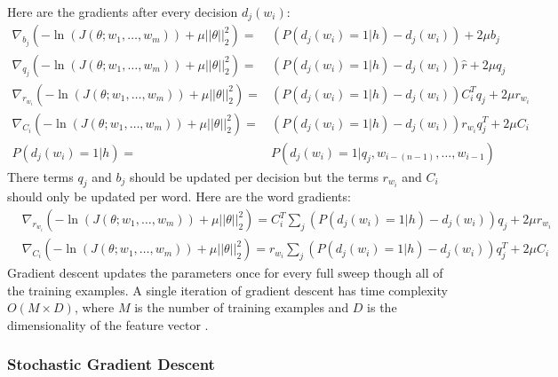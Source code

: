 Here are the gradients after every decision $d_j(w_i)$:
\begin{align}
\nabla_{b_j} \left( -\ln(J(\theta;w_1,\dots, w_m)) +  \mu ||\theta||^2_2 \right)  = &  \left( P \left(d_j(w_i) = 1 | h \right) - d_j(w_i) \right) +2\mu b_j  \label{eq:gradients}
\\
\nabla_{q_j} \left( -\ln(J(\theta;w_1,\dots, w_m)) +  \mu ||\theta||^2_2 \right)  = &\left( P \left(d_j(w_i) = 1 | h \right) - d_j(w_i) \right)\hat{r} +2\mu q_j \nonumber
\\
\nabla_{r_{w_i}} \left( -\ln(J(\theta;w_1,\dots, w_m)) +  \mu ||\theta||^2_2 \right)  = & \left( P \left(d_j(w_i) = 1 | h \right) - d_j(w_i)\right) C_i^T q_j   +2\mu r_{w_i} \nonumber
\\
\nabla_{C_i} \left( -\ln(J(\theta;w_1,\dots, w_m)) +  \mu ||\theta||^2_2 \right)  = &\left( P \left(d_j(w_i) = 1 | h \right) - d_j(w_i) \right) r_{w_i}q_j^T  +2\mu C_i \nonumber
\\
P \left(d_j(w_i) = 1 | h \right)= & P \left(d_j(w_i) = 1 | q_j, w_{i-(n-1)},\dots, w_{i-1} \right) \nonumber
\end{align}
There terms $q_j$ and $b_j$ should be updated per decision but the terms $r_{w_i}$ and $C_i$ should only be updated per word. Here are the word gradients:
\begin{align}
& \nabla_{r_{w_i}} \left( -\ln(J(\theta;w_1,\dots, w_m)) +  \mu ||\theta||^2_2 \right)  =  C_i^T \sum_j \left( P \left(d_j(w_i) = 1 | h \right)  - d_j(w_i) \right)q_j +2\mu r_{w_i} \nonumber
\\
& \nabla_{C_i} \left( -\ln(J(\theta;w_1,\dots, w_m)) +  \mu ||\theta||^2_2 \right)  =  r_{w_i} \sum_j \left( P \left(d_j(w_i) = 1 | h \right) - d_j(w_i) \right) q_j^T  +2\mu C_i
\end{align}
Gradient descent updates the parameters once for every full sweep though all of the training examples. A single iteration of gradient descent has time complexity $O(M\times D)$, where $M$ is the number of training examples and $D$ is the dimensionality of the feature vector \cite{Elkan2013}. 

\subsubsection{Stochastic Gradient Descent}
